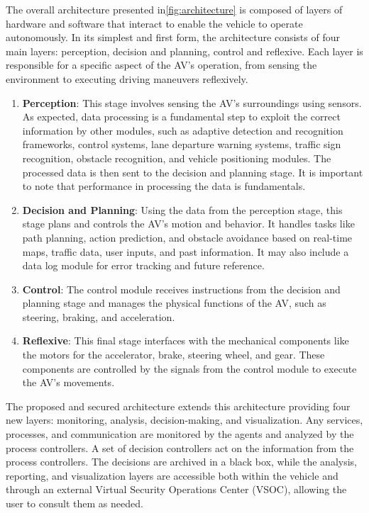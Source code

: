 The overall architecture presented in\ref{fig:architecture} is composed of layers of hardware and software that interact to enable the vehicle to operate autonomously.
In its simplest and first form, the architecture consists of four main layers: perception, decision and planning, control and reflexive.
Each layer is responsible for a specific aspect of the AV's operation, from sensing the environment to executing driving maneuvers reflexively\cite{architecture}.

\begin{enumerate}
    \item \textbf{Perception}: This stage involves sensing the AV's surroundings using sensors.
    As expected, data processing is a fundamental step to exploit the correct information by other modules, such as adaptive detection and recognition frameworks, control systems, lane departure warning systems, traffic sign recognition, obstacle recognition, and vehicle positioning modules.
    The processed data is then sent to the decision and planning stage.
    It is important to note that performance in processing the data is fundamentals.
    \item \textbf{Decision and Planning}: Using the data from the perception stage, this stage plans and controls the AV's motion and behavior.
    It handles tasks like path planning, action prediction, and obstacle avoidance based on real-time maps, traffic data, user inputs, and past information.
    It may also include a data log module for error tracking and future reference.
    \item \textbf{Control}: The control module receives instructions from the decision and planning stage and manages the physical functions of the AV, such as steering, braking, and acceleration.
    \item \textbf{Reflexive}: This final stage interfaces with the mechanical components like the motors for the accelerator, brake, steering wheel, and gear.
    These components are controlled by the signals from the control module to execute the AV’s movements.
\end{enumerate}

The proposed and secured architecture extends this architecture providing four new layers: monitoring, analysis, decision-making, and visualization.
Any services, processes, and communication are monitored by the agents and analyzed by the process controllers.
A set of decision controllers act on the information from the process controllers.
The decisions are archived in a black box, while the analysis, reporting, and visualization layers are accessible both within the vehicle and through an external Virtual Security Operations Center (VSOC), allowing the user to consult them as needed\cite{adu-kyere2023self-aware}.

